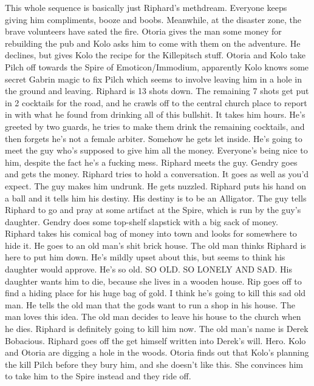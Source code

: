 This whole sequence is basically just Riphard’s methdream. Everyone keeps giving him compliments, booze and boobs.\medskip
Meanwhile, at the disaster zone, the brave volunteers have sated the fire.\medskip
Otoria gives the man some money for rebuilding the pub and Kolo asks him to come with them on the adventure. He declines, but gives Kolo the recipe for the Killepitsch stuff.\medskip
Otoria and Kolo take Pilch off towards the Spire of Emoticon/Immodium, apparently Kolo knows some secret Gabrin magic to fix Pilch which seems to involve leaving him in a hole in the ground and leaving.\medskip
Riphard is 13 shots down. The remaining 7 shots get put in 2 cocktails for the road, and he crawls off to the central church place to report in with what he found from drinking all of this bullshit. It takes him hours.\medskip
He’s greeted by two guards, he tries to make them drink the remaining cocktails, and then forgets he’s not a female arbiter. Somehow he gets let inside.\medskip
He’s going to meet the guy who’s supposed to give him all the money. Everyone’s being nice to him, despite the fact he’s a fucking mess.\medskip
Riphard meets the guy. Gendry goes and gets the money.\medskip
Riphard tries to hold a conversation. It goes as well as you’d expect.\medskip
The guy makes him undrunk. He gets nuzzled.\medskip
Riphard puts his hand on a ball and it tells him his destiny. His destiny is to be an Alligator.\medskip
The guy tells Riphard to go and pray at some artifact at the Spire, which is run by the guy’s daughter.\medskip
Gendry does some top-shelf slapstick with a big sack of money.\medskip
Riphard takes his comical bag of money into town and looks for somewhere to hide it. He goes to an old man’s shit brick house.\medskip
The old man thinks Riphard is here to put him down. He’s mildly upset about this, but seems to think his daughter would approve.\medskip
He’s so old.\medskip
SO OLD.\medskip
SO LONELY AND SAD.\medskip
His daughter wants him to die, because she lives in a wooden house.\medskip
Rip goes off to find a hiding place for his huge bag of gold. I think he’s going to kill this sad old man.\medskip
He tells the old man that the gods want to run a shop in his house. The man loves this idea.\medskip
The old man decides to leave his house to the church when he dies. Riphard is definitely going to kill him now.\medskip
The old man’s name is Derek Bobacious.\medskip
Riphard goes off the get himself written into Derek’s will. Hero.\medskip
Kolo and Otoria are digging a hole in the woods. Otoria finds out that Kolo’s planning the kill Pilch before they bury him, and she doesn’t like this. She convinces him to take him to the Spire instead and they ride off.\medskip
